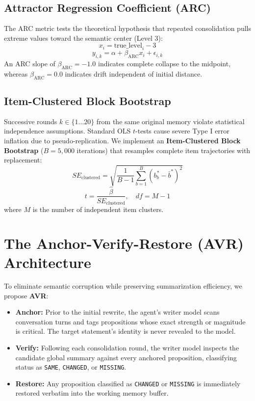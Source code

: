 \documentclass[12pt,a4paper]{report}
\begin{document}
\subsection{Attractor Regression Coefficient (ARC)}
The ARC metric tests the theoretical hypothesis that repeated consolidation pulls extreme values toward the semantic center (Level 3):
\begin{equation}
x_i = \text{true\_level}_i - 3
\end{equation}
\begin{equation}
y_{i,k} = \alpha + \beta_{\text{ARC}} x_i + \epsilon_{i,k}
\end{equation}
An ARC slope of $\beta_{\text{ARC}} = -1.0$ indicates complete collapse to the midpoint, whereas $\beta_{\text{ARC}} = 0.0$ indicates drift independent of initial distance.

\subsection{Item-Clustered Block Bootstrap}
Successive rounds $k \in \{1 \dots 20\}$ from the same original memory violate statistical independence assumptions. Standard OLS $t$-tests cause severe Type I error inflation due to pseudo-replication. We implement an \textbf{Item-Clustered Block Bootstrap} ($B=5,000$ iterations) that resamples complete item trajectories with replacement:
\begin{equation}
SE_{\text{clustered}} = \sqrt{\frac{1}{B-1}\sum_{b=1}^B (b^*_b - \bar{b}^*)^2}
\end{equation}
\begin{equation}
t = \frac{\hat{\beta}}{SE_{\text{clustered}}}, \quad df = M - 1
\end{equation}
where $M$ is the number of independent item clusters.

\section{The Anchor-Verify-Restore (AVR) Architecture}
To eliminate semantic corruption while preserving summarization efficiency, we propose \textbf{AVR}:
\begin{itemize}
    \item \textbf{Anchor:} Prior to the initial rewrite, the agent's writer model scans conversation turns and tags propositions whose exact strength or magnitude is critical. The target statement's identity is never revealed to the model.
    \item \textbf{Verify:} Following each consolidation round, the writer model inspects the candidate global summary against every anchored proposition, classifying status as \texttt{SAME}, \texttt{CHANGED}, or \texttt{MISSING}.
    \item \textbf{Restore:} Any proposition classified as \texttt{CHANGED} or \texttt{MISSING} is immediately restored verbatim into the working memory buffer.
\end{itemize}
\end{document}
